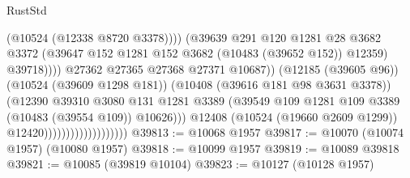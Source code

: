 \begin{lexlean}{RustStd}
\begin{coremodule}
                                                          (@10524 (@12338 @8720 @3378))))
                                                      (@39639
                                                        @291
                                                        @120
                                                        @1281
                                                        @28
                                                        @3682
                                                        @3372
                                                        (@39647
                                                          @152
                                                          @1281
                                                          @152
                                                          @3682
                                                          (@10483 (@39652 @152))
                                                          @12359)
                                                        @39718))))
                                                @27362
                                                @27365
                                                @27368
                                                @27371
                                                @10687))
                                            (@12185 (@39605 @96))
                                            (@10524 (@39609 @1298 @181))
                                            (@10408 (@39616 @181 @98 @3631 @3378))
                                            (@12390
                                              @39310
                                              @3080
                                              @131
                                              @1281
                                              @3389
                                              (@39549
                                                @109
                                                @1281
                                                @109
                                                @3389
                                                (@10483 (@39554 @109))
                                                @10626)))
                                          @12408
                                          (@10524 (@19660 @2609 @1299))
                                          @12420)))))))))))))))))))
@39813 := @10068 @1957
@39817 := @10070 (@10074 @1957) (@10080 @1957)
@39818 := @10099 @1957
@39819 := @10089 @39818
@39821 := @10085 (@39819 @10104)
@39823 := @10127 (@10128 @1957)

\end{coremodule}
\end{lexlean}
